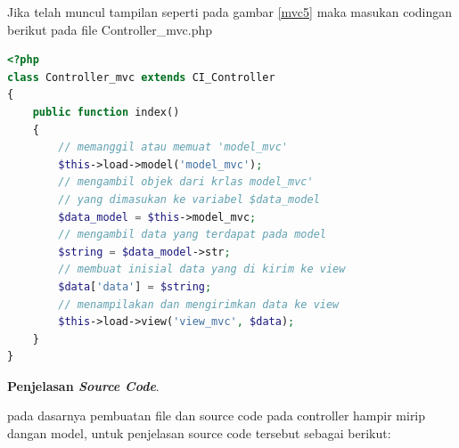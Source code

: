 Jika telah muncul tampilan seperti pada gambar \ref{mvc5} maka masukan codingan berikut pada file Controller\_mvc.php
\begin{lstlisting}[language=PHP]
<?php
class Controller_mvc extends CI_Controller
{
    public function index()
    {
        // memanggil atau memuat 'model_mvc'
        $this->load->model('model_mvc');
        // mengambil objek dari krlas model_mvc'
        // yang dimasukan ke variabel $data_model
        $data_model = $this->model_mvc;
        // mengambil data yang terdapat pada model
        $string = $data_model->str;
        // membuat inisial data yang di kirim ke view
        $data['data'] = $string;
        // menampilakan dan mengirimkan data ke view
        $this->load->view('view_mvc', $data);
    }
}

\end{lstlisting} 
\pagebreak
\textbf{Penjelasan \textit{Source Code}}.\par
	pada dasarnya pembuatan file dan source code pada controller hampir mirip dangan model, untuk penjelasan source code tersebut sebagai berikut:
